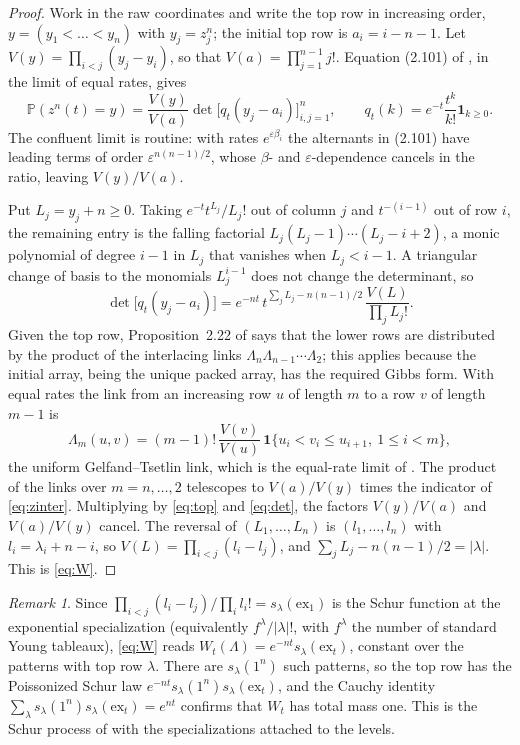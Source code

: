 \documentclass[11pt]{amsart}
\theoremstyle{remark}
\newtheorem{remark}[theorem]{Remark}
\numberwithin{equation}{section}
\newcommand{\Pp}{\mathbb P}
\newcommand{\1}{\mathbf 1}
\begin{document}
\begin{proof}
Work in the raw coordinates and write the top row in increasing order, $y=(y_1<\dots<y_n)$ with $y_j=z^n_j$; the initial top row is $a_i=i-n-1$. Let $V(y)=\prod_{i<j}(y_j-y_i)$, so that $V(a)=\prod_{j=1}^{n-1}j!$. Equation (2.101) of \cite{BF}, in the limit of equal rates, gives
\begin{equation}\label{eq:top}
\Pp(z^n(t)=y)=\frac{V(y)}{V(a)}\det\bigl[q_t(y_j-a_i)\bigr]_{i,j=1}^n,\qquad q_t(k)=e^{-t}\frac{t^k}{k!}\1_{k\ge0}.
\end{equation}
The confluent limit is routine: with rates $e^{\varepsilon\beta_i}$ the alternants in (2.101) have leading terms of order $\varepsilon^{n(n-1)/2}$, whose $\beta$- and $\varepsilon$-dependence cancels in the ratio, leaving $V(y)/V(a)$.

Put $L_j=y_j+n\ge0$. Taking $e^{-t}t^{L_j}/L_j!$ out of column $j$ and $t^{-(i-1)}$ out of row $i$, the remaining entry is the falling factorial $L_j(L_j-1)\cdots(L_j-i+2)$, a monic polynomial of degree $i-1$ in $L_j$ that vanishes when $L_j<i-1$. A triangular change of basis to the monomials $L_j^{i-1}$ does not change the determinant, so
\begin{equation}\label{eq:det}
\det\bigl[q_t(y_j-a_i)\bigr]=e^{-nt}\,t^{\sum_jL_j-n(n-1)/2}\,\frac{V(L)}{\prod_jL_j!}.
\end{equation}
Given the top row, Proposition~2.22 of \cite{BF} says that the lower rows are distributed by the product of the interlacing links $\Lambda_n\Lambda_{n-1}\cdots\Lambda_2$; this applies because the initial array, being the unique packed array, has the required Gibbs form. With equal rates the link from an increasing row $u$ of length $m$ to a row $v$ of length $m-1$ is
\[
\Lambda_m(u,v)=(m-1)!\,\frac{V(v)}{V(u)}\,\1\{u_i<v_i\le u_{i+1},\ 1\le i<m\},
\]
the uniform Gelfand--Tsetlin link, which is the equal-rate limit of \cite[(2.94) and Lemma~2.13(ii)]{BF}. The product of the links over $m=n,\dots,2$ telescopes to $V(a)/V(y)$ times the indicator of \eqref{eq:zinter}. Multiplying by \eqref{eq:top} and \eqref{eq:det}, the factors $V(y)/V(a)$ and $V(a)/V(y)$ cancel. The reversal of $(L_1,\dots,L_n)$ is $(l_1,\dots,l_n)$ with $l_i=\lambda_i+n-i$, so $V(L)=\prod_{i<j}(l_i-l_j)$, and $\sum_jL_j-n(n-1)/2=|\lambda|$. This is \eqref{eq:W}.
\end{proof}

\begin{remark}\label{rem:schur}
Since $\prod_{i<j}(l_i-l_j)/\prod_il_i!=s_\lambda(\mathrm{ex}_1)$ is the Schur function at the exponential specialization (equivalently $f^\lambda/|\lambda|!$, with $f^\lambda$ the number of standard Young tableaux), \eqref{eq:W} reads $W_t(\Lambda)=e^{-nt}s_\lambda(\mathrm{ex}_t)$, constant over the patterns with top row $\lambda$. There are $s_\lambda(1^n)$ such patterns, so the top row has the Poissonized Schur law $e^{-nt}s_\lambda(1^n)s_\lambda(\mathrm{ex}_t)$, and the Cauchy identity $\sum_\lambda s_\lambda(1^n)s_\lambda(\mathrm{ex}_t)=e^{nt}$ \cite{Mac} confirms that $W_t$ has total mass one. This is the Schur process of \cite{OR} with the specializations attached to the levels.
\end{remark}
\end{document}
